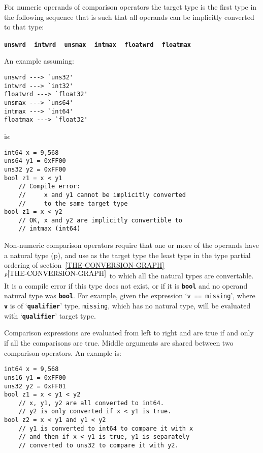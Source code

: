 \documentclass[12pt]{article}
\newcommand{\TT}[1]{{\tt \bfseries #1}}
\newcommand{\itemref}[1]{\ref{#1}$^{p\pageref{#1}}$}
\newcommand{\pagref}[1]{p\pageref{#1}}
\newenvironment{indpar}[1][0.3in]%
	{\begin{list}{}%
		     {\setlength{\itemsep}{0in}%
		      \setlength{\topsep}{0in}%
		      \setlength{\parsep}{1ex}%
		      \setlength{\labelwidth}{#1}%
		      \setlength{\leftmargin}{#1}%
		      \addtolength{\leftmargin}{\labelsep}}%
	 \item}%
	{\end{list}}
\begin{document}
For numeric operands of comparison operators
the target type is the first type
in the following sequence that is such that all operands
can be implicitly converted to that type:
\begin{center}
\TT{unswrd} ~ \TT{intwrd} ~ \TT{unsmax} ~ \TT{intmax}
           ~ \TT{floatwrd} ~ \TT{floatmax}
\end{center}

An example assuming:


\begin{indpar}\begin{verbatim}
unswrd ---> `uns32'
intwrd ---> `int32'
floatwrd ---> `float32'
unsmax ---> `uns64'
intmax ---> `int64'
floatmax ---> `float32'
\end{verbatim}\end{indpar}

is:

\begin{indpar}\begin{verbatim}
int64 x = 9,568
uns64 y1 = 0xFF00
uns32 y2 = 0xFF00
bool z1 = x < y1
    // Compile error:
    //     x and y1 cannot be implicitly converted
    //     to the same target type
bool z1 = x < y2
    // OK, x and y2 are implicitly convertible to
    // intmax (int64)
\end{verbatim}\end{indpar}

Non-numeric comparison operators require that one or more of
the operands have a natural type (\pagref{NATURAL-TYPE}),
and use as the target type
the least type in the type partial ordering
of section~\itemref{THE-CONVERSION-GRAPH} to which all the natural
types are convertable.  It is a compile error if this type does
not exist, or if it is \TT{bool} and no operand natural type was \TT{bool}.
For example, given the expression `{\tt v == missing}', where \TT{v}
is of `\TT{qualifier}' type, {\tt missing}, which has no natural type, will be
evaluated with `\TT{qualifier}' target type.

Comparison expressions are evaluated from left to right and are
true if and only if all the comparisons are true.  Middle
arguments are shared between two comparison operators.
An example is:

\begin{indpar}\begin{verbatim}
int64 x = 9,568
uns16 y1 = 0xFF00
uns32 y2 = 0xFF01
bool z1 = x < y1 < y2
    // x, y1, y2 are all converted to int64.
    // y2 is only converted if x < y1 is true.
bool z2 = x < y1 and y1 < y2
    // y1 is converted to int64 to compare it with x
    // and then if x < y1 is true, y1 is separately
    // converted to uns32 to compare it with y2.
\end{verbatim}\end{indpar}
\end{document}

